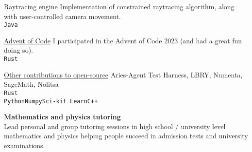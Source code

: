 \documentclass[9pt]{developercv} %
\begin{document}
\begin{entrylist}
	\entry
		{}
		{\href{https://github.com/mirgee/raytracing_engine}{Raytracing engine}}
		{}
		{Implementation of constrained raytracing algorithm, along with user-controlled camera movement.
         \\\texttt{Java}
        }

	\entry
		{}
		{\href{https://github.com/mirgee/advent-of-code}{Advent of Code}}
		{}
    {I participated in the Advent of Code 2023 (and had a great fun doing so).\\
         \texttt{Rust}}

	\entry
		{}
		{\href{}{Other contributions to open-source}}
		{}
		{Aries-Agent Test Harness, LBRY, Numenta, SageMath, Nolitsa
         \\\texttt{Rust}\\\texttt{Python}\slashsep\texttt{Numpy}\slashsep\texttt{Sci-kit Learn}\slashsep\texttt{C++}
        }
\end{entrylist}



\textbf{Mathematics and physics tutoring}\\Lead personal and group tutoring sessions in high school / university level mathematics and physics helping people succeed in admission tests and university examinations.
\end{document}
